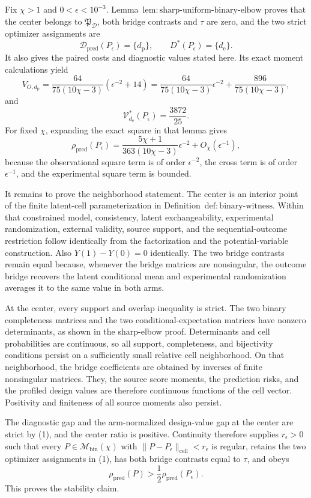 Fix \(\chi>1\) and \(0<\epsilon<10^{-3}\).  Lemma~\(\mathrm{lem{:}sharp\text{-}uniform\text{-}binary\text{-}elbow}\) proves that the center belongs to \(\mathfrak P_{\mathcal D}\), both bridge contrasts and \(\tau\) are zero, and the two strict optimizer assignments are
\[
 \mathcal D_{\mathrm{pred}}(P_\epsilon)=\{d_{\mathrm p}\},
 \qquad
 D^*(P_\epsilon)=\{d_{\mathrm e}\}.                     \tag{1}
\]
It also gives the paired costs and diagnostic values stated here.  Its exact moment calculations yield
\[
 V_{O,d_{\mathrm p}}
 =\frac{64}{75(10\chi-3)}(\epsilon^{-2}+14)
 =\frac{64}{75(10\chi-3)}\epsilon^{-2}
 +\frac{896}{75(10\chi-3)},                              \tag{2}
\]
and
\[
 \mathcal V_{d_{\mathrm e}}^*(P_\epsilon)=\frac{3872}{25}. \tag{3}
\]
For fixed \(\chi\), expanding the exact square in that lemma gives
\[
 \rho_{\mathrm{pred}}(P_\epsilon)
 =\frac{5\chi+1}{363(10\chi-3)}\epsilon^{-2}
 +O_\chi(\epsilon^{-1}),                                \tag{4}
\]
because the observational square term is of order \(\epsilon^{-2}\), the cross term is of order \(\epsilon^{-1}\), and the experimental square term is bounded.

It remains to prove the neighborhood statement.  The center is an interior point of the finite latent-cell parameterization in Definition~\(\mathrm{def{:}binary\text{-}witness}\).  Within that constrained model, consistency, latent exchangeability, experimental randomization, external validity, source support, and the sequential-outcome restriction follow identically from the factorization and the potential-variable construction.  Also \(Y(1)-Y(0)=0\) identically.  The two bridge contrasts remain equal because, whenever the bridge matrices are nonsingular, the outcome bridge recovers the latent conditional mean and experimental randomization averages it to the same value in both arms.

At the center, every support and overlap inequality is strict.  The two binary completeness matrices and the two conditional-expectation matrices have nonzero determinants, as shown in the sharp-elbow proof.  Determinants and cell probabilities are continuous, so all support, completeness, and bijectivity conditions persist on a sufficiently small relative cell neighborhood.  On that neighborhood, the bridge coefficients are obtained by inverses of finite nonsingular matrices.  They, the source score moments, the prediction risks, and the profiled design values are therefore continuous functions of the cell vector.  Positivity and finiteness of all source moments also persist.

The diagnostic gap and the arm-normalized design-value gap at the center are strict by (1), and the center ratio is positive.  Continuity therefore supplies \(r_\epsilon>0\) such that every \(P\in\mathcal M_{\mathrm{bin}}(\chi)\) with \(\|P-P_\epsilon\|_{\mathrm{cell}}<r_\epsilon\) is regular, retains the two optimizer assignments in (1), has both bridge contrasts equal to \(\tau\), and obeys
\[
 \rho_{\mathrm{pred}}(P)>\frac12\rho_{\mathrm{pred}}(P_\epsilon).
\]
This proves the stability claim.